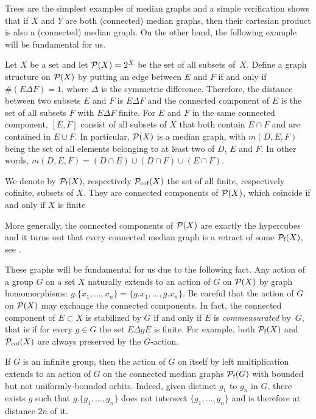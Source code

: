 Trees are the simplest examples of median graphs and a simple verification shows that if $X$ and $Y$ are both (connected) median graphs, then their cartesian product is also a (connected) median graph.
On the other hand, the following example will be fundamental for us.
%
%
\begin{exmp}\label{Ex:MainMedian}
Let $X$ be a set and let  $\mathcal P(X)=2^X$ be the set of all subsets of~$X$.
Define a graph structure on $\mathcal P(X)$ by putting an edge between $E$ and $F$ if and only if $\#(E\Delta F)=1$, where $\Delta$ is the symmetric difference.
Therefore, the distance between two subsets $E$ and $F$ is $E\Delta F$ and
the connected component of $E$ is the set of all subsets $F$ with $E\Delta F$ finite.
For $E$ and $F$ in the same connected component, $[E,F]$ consist of all subsets of $X$ that both contain $E\cap F$ and are contained in $E\cup F$.
In particular, $\mathcal P(X)$ is a median graph, with $m(D,E,F)$ being the set of all elements belonging to at least two of $D$, $E$ and $F$. In other words, $m(D,E,F)=(D\cap E)\cup(D\cap F)\cup(E\cap F)$.
\end{exmp}
%
%
We denote by $\mathcal P_{\textnormal{f}}(X)$, respectively $\mathcal P_{\textnormal{cof}}(X)$ the set of all finite, respectively cofinite, subsets of $X$.
They are connected components of $\mathcal P(X)$, which coincide if and only if $X$ is finite

More generally, the connected components of $\mathcal P(X)$ are exactly the hypercubes and it turns out that every connected median graph is a retract of some $\mathcal P_{\textnormal{f}}(X)$, see \cite{Bandelt1984}.

These graphs will be fundamental for us due to the following fact.
Any action of a group $G$ on a set $X$ naturally extends to an action of $G$ on $\mathcal P(X)$ by graph homomorphisms: $g.\{x_1,\dots,x_n\}=\{g.x_1,\dots,g.x_n\}$.
Be careful that the action of $G$ on $\mathcal P(X)$ may exchange the connected components.
In fact, the connected component of $E\subset X$ is stabilized by $G$ if and only if $E$ is \emph{commensurated} by~$G$, that is if for every $g\in G$ the set $E\Delta gE$ is finite.
For example, both $\mathcal P_{\textnormal{f}}(X)$ and $\mathcal P_{\textnormal{cof}}(X)$ are always preserved by the $G$-action.

If $G$ is an infinite group, then the action of $G$ on itself by left multiplication extends to an action of $G$ on the connected median graphs $\mathcal P_{\textnormal{f}}(G)$ with bounded but not uniformly-bounded orbits. Indeed, given distinct $g_1$ to $g_n$ in $G$, there exists $g$ such that $g.\{g_1,\dots,g_n\}$ does not intersect $\{g_1,\dots,g_n\}$ and is therefore at distance $2n$ of it.

